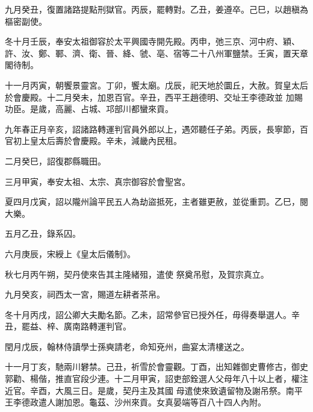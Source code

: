 \begin{pinyinscope}
 九月癸丑，復置諸路提點刑獄官。丙辰，罷轉對。乙丑，姜遵卒。己巳，以趙稹為樞密副使。



 冬十月壬辰，奉安太祖御容於太平興國寺開先殿。丙申，弛三京、河中府、穎、許、汝、鄭、鄆、濟、衛、晉、絳、虢、亳、宿等二十八州軍鹽禁。壬寅，置天章閣待制。



 十一月丙寅，朝饗景靈宮。丁卯，饗太廟。戊辰，祀天地於圜丘，大赦。賀皇太后於會慶殿。十二月癸未，加恩百官。辛丑，西平王趙德明、交址王李德政並
 加賜功臣。是歲，高麗、占城、邛部川都蠻來貢。



 九年春正月辛亥，詔諸路轉運判官員外郎以上，遇郊聽任子弟。丙辰，長寧節，百官初上皇太后壽於會慶殿。辛未，減畿內民租。



 二月癸巳，詔復郡縣職田。



 三月甲寅，奉安太祖、太宗、真宗御容於會聖宮。



 夏四月戊寅，詔以隴州論平民五人為劫盜抵死，主者雖更赦，並從重罰。乙巳，閱大樂。



 五月乙丑，錄系囚。



 六月庚辰，宋綬上《皇太后儀制》。



 秋七月丙午朔，契丹使來告其主隆緒殂，遣使
 祭奠吊慰，及賀宗真立。



 九月癸亥，祠西太一宮，賜道左耕者茶帛。



 冬十月丙戌，詔公卿大夫勵名節。乙未，詔常參官已授外任，毋得奏舉選人。辛丑，罷益、梓、廣南路轉運判官。



 閏月戊辰，翰林侍讀學士孫奭請老，命知兗州，曲宴太清樓送之。



 十一月丁亥，馳兩川礬禁。己丑，祈雪於會靈觀。丁酉，出知雜御史曹修古，御史郭勸、楊偕，推直官段少連。十二月甲寅，詔吏部銓選人父母年八十以上者，權注近官。辛酉，大風三日。是歲，契丹主及其國
 母遣使來致遺留物及謝吊祭。南平王李德政遣人謝加恩。龜茲、沙州來貢。女真晏端等百八十四人內附。



\end{pinyinscope}
